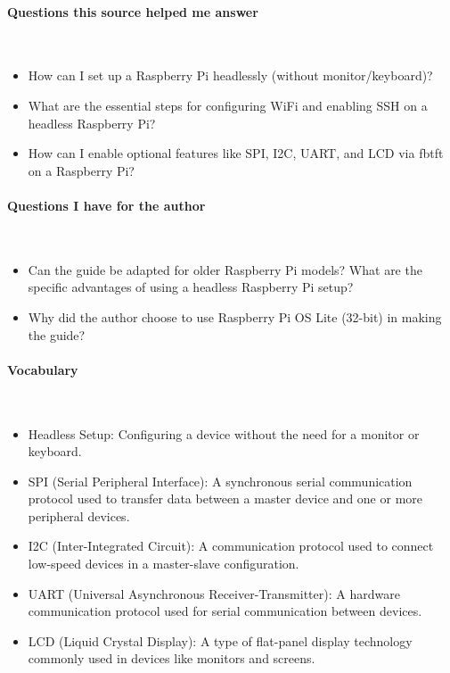 \vspace*{-0.5cm}
\paragraph{Questions this source helped me answer} \

\begin{itemize}
    \item How can I set up a Raspberry Pi headlessly (without monitor/keyboard)?
    \item What are the essential steps for configuring WiFi and enabling SSH on a headless Raspberry Pi?
    \item How can I enable optional features like SPI, I2C, UART, and LCD via fbtft on a Raspberry Pi?    
\end{itemize}

\vspace*{-0.5cm}
\paragraph{Questions I have for the author} \ 

\begin{itemize}
    \item Can the guide be adapted for older Raspberry Pi models?
    What are the specific advantages of using a headless Raspberry Pi setup?
    \item Why did the author choose to use Raspberry Pi OS Lite (32-bit) in making the guide?
\end{itemize}

\vspace{-0.5cm}
\paragraph{Vocabulary} \ 

\begin{itemize}
\item Headless Setup: Configuring a device without the need for a monitor or keyboard.
\item SPI (Serial Peripheral Interface): A synchronous serial communication protocol used to transfer data between a master device and one or more peripheral devices.
\item I2C (Inter-Integrated Circuit): A communication protocol used to connect low-speed devices in a master-slave configuration.
\item UART (Universal Asynchronous Receiver-Transmitter): A hardware communication protocol used for serial communication between devices.
\item LCD (Liquid Crystal Display): A type of flat-panel display technology commonly used in devices like monitors and screens.
\end{itemize}

